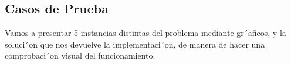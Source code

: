 \subsection{Casos de Prueba}

Vamos a presentar 5 instancias distintas del problema mediante gr´aficos, y la soluci´on que nos devuelve la implementaci´on, de manera de hacer una comprobaci´on visual del funcionamiento.

